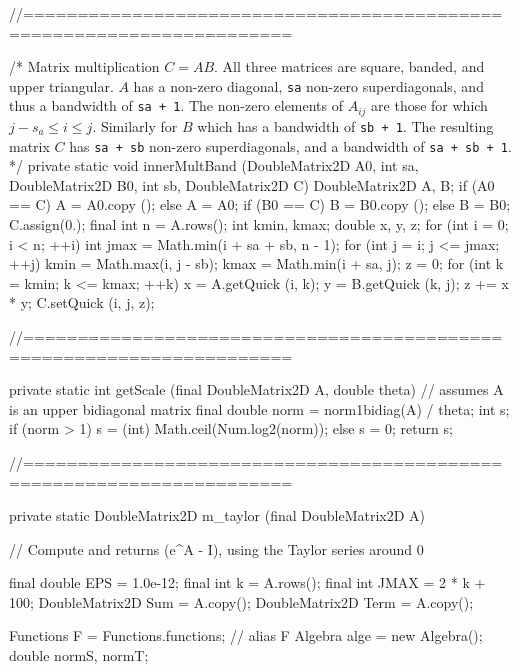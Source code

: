 \begin{code}
\begin{hide}
{   //======================================================================

   /*
    Matrix multiplication $C = AB$. All three matrices are square, banded,
    and upper triangular. $A$ has a non-zero diagonal, \texttt{sa} non-zero
    superdiagonals, and thus a bandwidth of \texttt{sa + 1}. The non-zero
    elements of $A_{ij}$ are those for which $j - s_a \le i \le j$.
    Similarly for $B$ which has a bandwidth of \texttt{sb + 1}.
    The resulting matrix $C$ has \texttt{sa + sb} non-zero superdiagonals,
    and a bandwidth of \texttt{sa + sb + 1}.
   */
   private static void innerMultBand (DoubleMatrix2D A0, int sa,
                                      DoubleMatrix2D B0, int sb,
                                      DoubleMatrix2D C) {
      DoubleMatrix2D A, B;
      if (A0 == C)
         A = A0.copy ();
      else
         A = A0;
      if (B0 == C)
         B = B0.copy ();
      else
         B = B0;
      C.assign(0.);
      final int n = A.rows();
      int kmin, kmax;
      double x, y, z;
      for (int i = 0; i < n; ++i) {
         int jmax = Math.min(i + sa + sb, n - 1);
         for (int j = i; j <= jmax; ++j) {
            kmin = Math.max(i, j - sb);
            kmax = Math.min(i + sa, j);
            z = 0;
            for (int k = kmin; k <= kmax; ++k) {
               x = A.getQuick (i, k);
               y = B.getQuick (k, j);
               z += x * y;
            }
            C.setQuick (i, j, z);
         }
      }
   }


   //======================================================================

   private static int getScale (final DoubleMatrix2D A, double theta)
   {
      // assumes A is an upper bidiagonal matrix
      final double norm = norm1bidiag(A) / theta;
      int s;
      if (norm > 1)
         s = (int) Math.ceil(Num.log2(norm));
      else
         s = 0;
      return s;
   }


   //======================================================================

   private static DoubleMatrix2D m_taylor (final DoubleMatrix2D A)
   {
      // Compute and returns (e^A - I), using the Taylor series around 0

      final double EPS = 1.0e-12;
      final int k = A.rows();
      final int JMAX = 2 * k + 100;
      DoubleMatrix2D Sum = A.copy();
      DoubleMatrix2D Term = A.copy();

      Functions F = Functions.functions;    // alias F
      Algebra alge = new Algebra();
      double normS, normT;

}}
\end{hide}
\end{code}
